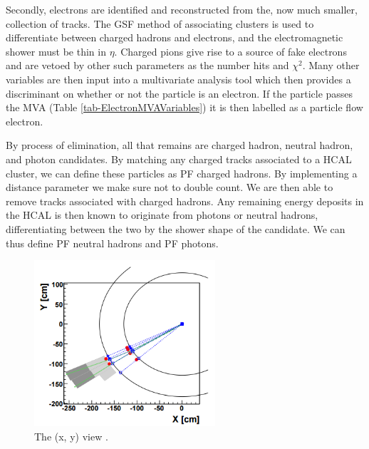 Secondly, electrons are identified and reconstructed from the, now much smaller, collection of tracks. The GSF method of associating clusters is used to differentiate between charged hadrons and electrons, and the electromagnetic shower must be thin in $\eta$. Charged pions give rise to a source of fake electrons and are vetoed by other such parameters as the number hits and $\chi^2$. Many other variables are then input into a multivariate analysis tool which then provides a discriminant on whether or not the particle is an electron. If the particle passes the MVA (Table \ref{tab-ElectronMVAVariables}) it is then labelled as a particle flow electron.

By process of elimination, all that remains are charged hadron, neutral hadron, and photon candidates. By matching any charged tracks associated to a HCAL cluster, we can define these particles as PF charged hadrons. By implementing a distance parameter we make sure not to double count. We are then able to remove tracks associated with charged hadrons. Any remaining energy deposits in the HCAL is then known to originate from photons or neutral hadrons, differentiating between the two by the shower shape of the candidate. We can thus define PF neutral hadrons and PF photons. 

\begin{figure}
\begin{center}
\includegraphics[width=0.6\textwidth]{Figures/PF.png}
\caption{The (x, y) view \cite{CMS-PAS-PFT-09-001}.}
\end{center}
\end{figure}

